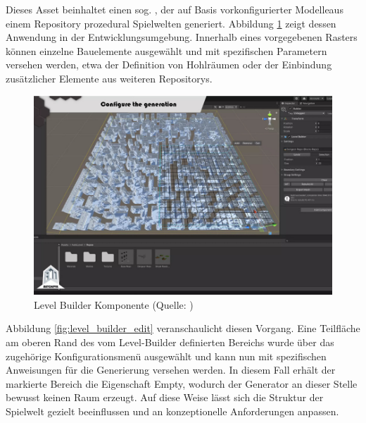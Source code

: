 Dieses Asset beinhaltet einen sog. , der auf Basis vorkonfigurierter Modelleaus einem Repository prozedural Spielwelten generiert. Abbildung \ref{fig:level_builder} zeigt dessen Anwendung in der Entwicklungsumgebung. Innerhalb eines vorgegebenen Rasters können einzelne Bauelemente ausgewählt und mit spezifischen Parametern versehen werden, etwa der Definition von Hohlräumen oder der Einbindung zusätzlicher Elemente aus weiteren Repositorys.

\begin{figure}[ht]
\centering
\includegraphics[width=1\linewidth]{content/pictures/FirstSteps00.png}
\caption{Level Builder Komponente (Quelle: \citealp{alasl_autolevel_2022})}
\label{fig:level_builder}
\end{figure}

Abbildung \ref{fig:level_builder_edit} veranschaulicht diesen Vorgang. Eine Teilfläche am oberen Rand des vom Level-Builder definierten Bereichs wurde über das zugehörige Konfigurationsmenü ausgewählt und kann nun mit spezifischen Anweisungen für die Generierung versehen werden. In diesem Fall erhält der markierte Bereich die Eigenschaft Empty, wodurch der Generator an dieser Stelle bewusst keinen Raum erzeugt. Auf diese Weise lässt sich die Struktur der Spielwelt gezielt beeinflussen und an konzeptionelle Anforderungen anpassen.

